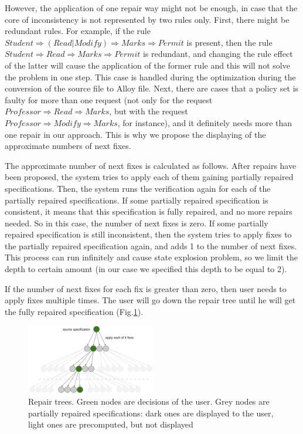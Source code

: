 \documentclass{acm_proc_article-sp}
\begin{document}
However, the application of one repair way might not be enough, in case that the core of inconsistency is not represented by two rules only. First, there might be redundant rules. For example, if the rule $Student \Rightarrow (Read | Modify) \Rightarrow Marks \Rightarrow Permit$ is present, then the rule $Student \Rightarrow Read \Rightarrow Marks \Rightarrow Permit$ is redundant, and changing the rule effect of the latter will cause the application of the former rule and this will not solve the problem in one step. This case is handled during the optimization during the conversion of the source file to Alloy file. Next, there are cases that a policy set is faulty for more than one request (not only for the request $Professor \Rightarrow Read \Rightarrow Marks$, but with the request  $Professor \Rightarrow  Modify \Rightarrow Marks$, for instance), and it definitely needs more than one repair in our approach. This is why we propose the displaying of the approximate numbers of next fixes.

The approximate number of next fixes is calculated as follows. After repairs have been proposed, the system tries to apply each of them gaining partially repaired specifications. Then, the system runs the verification again for each of the partially repaired specifications. If some partially repaired specification is consistent, it means that this specification is fully repaired, and no more repairs needed. So in this case, the number of next fixes is zero. If some partially repaired specification is still inconsistent, then the system tries to apply fixes to the partially repaired specification again, and adds 1 to the number of next fixes. This process can run infinitely and cause state explosion problem, so we limit the depth to certain amount (in our case we specified this depth to be equal to 2).

If the number of next fixes for each fix is greater than zero, then user needs to apply fixes multiple times. The user will go down the repair tree until he will get the fully repaired specification (Fig.\ref{fig:tree}).

\begin{figure}[h]
\includegraphics[width=0.5\textwidth]{tree.png}
\caption{Repair trees. Green nodes are decisions of the user. Grey nodes are partially repaired specifications: dark ones are displayed to the user, light ones are precomputed, but not displayed}    
  \label{fig:tree}
\end{figure}
\end{document}
